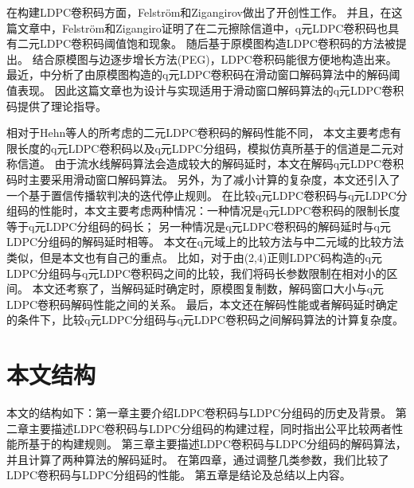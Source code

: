 在构建LDPC卷积码方面，Felström和Zigangirov做出了开创性工作\parencite{782171}。
并且，在这篇文章中，Felström和Zigangiro证明了在二元擦除信道中，q元LDPC卷积码也具有二元LDPC卷积码阈值饱和现象。
随后基于原模图\parencite{Thorpe2003Low}构造LDPC卷积码的方法被提出。
结合原模图与边逐步增长方法(PEG)\parencite{1377521}，LDPC卷积码能很方便地构造出来。
最近，\parencite{6874959}中分析了由原模图构造的q元LDPC卷积码在滑动窗口解码算法中的解码阈值表现。
因此这篇文章也为设计与实现适用于滑动窗口解码算法的q元LDPC卷积码提供了理论指导。

相对于Hehn等人的\parencite{5089507}所考虑的二元LDPC卷积码的解码性能不同，
本文主要考虑有限长度的q元LDPC卷积码以及q元LDPC分组码，模拟仿真所基于的信道是二元对称信道。
由于流水线解码算法会造成较大的解码延时，本文在解码q元LDPC卷积码时主要采用滑动窗口解码算法。
另外，为了减小计算的复杂度，本文还引入了一个基于置信传播软判决的迭代停止规则。
在比较q元LDPC卷积码与q元LDPC分组码的性能时，本文主要考虑两种情况：一种情况是q元LDPC卷积码的限制长度等于q元LDPC分组码的码长；
另一种情况是q元LDPC卷积码的解码延时与q元LDPC分组码的解码延时相等。
本文在q元域上的比较方法与\parencite{5089507}中二元域的比较方法类似，但是本文也有自己的重点。
比如，对于由(2,4)正则LDPC码构造的q元LDPC分组码与q元LDPC卷积码之间的比较，我们将码长参数限制在相对小的区间。
本文还考察了，当解码延时确定时，原模图复制数，解码窗口大小与q元LDPC卷积码解码性能之间的关系。
最后，本文还在解码性能或者解码延时确定的条件下，比较q元LDPC分组码与q元LDPC卷积码之间解码算法的计算复杂度。
\section{本文结构}
本文的结构如下：第一章主要介绍LDPC卷积码与LDPC分组码的历史及背景。
第二章主要描述LDPC卷积码与LDPC分组码的构建过程，同时指出公平比较两者性能所基于的构建规则。
第三章主要描述LDPC卷积码与LDPC分组码的解码算法，并且计算了两种算法的解码延时。
在第四章，通过调整几类参数，我们比较了LDPC卷积码与LDPC分组码的性能。
第五章是结论及总结以上内容。